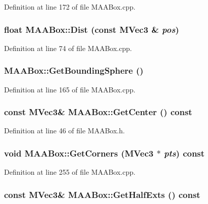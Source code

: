 Definition at line 172 of file MAABox.cpp.\hypertarget{class_m_a_a_box_f47c228010eab1bd502d80633d50953b}{
\subsubsection[{Dist}]{\setlength{\rightskip}{0pt plus 5cm}float MAABox::Dist (const {\bf MVec3} \& {\em pos})}}
\label{class_m_a_a_box_f47c228010eab1bd502d80633d50953b}




Definition at line 74 of file MAABox.cpp.\hypertarget{class_m_a_a_box_069339e97ffae23154079bca22eafaf7}{
\subsubsection[{GetBoundingSphere}]{ MAABox::GetBoundingSphere ()}}
\label{class_m_a_a_box_069339e97ffae23154079bca22eafaf7}




Definition at line 165 of file MAABox.cpp.\hypertarget{class_m_a_a_box_a9fbd78524a8e1c00a165177b7cf888f}{
\subsubsection[{GetCenter}]{\setlength{\rightskip}{0pt plus 5cm}const {\bf MVec3}\& MAABox::GetCenter () const}}
\label{class_m_a_a_box_a9fbd78524a8e1c00a165177b7cf888f}




Definition at line 46 of file MAABox.h.\hypertarget{class_m_a_a_box_1880d28cd10db452fd1ef1d9d74774c9}{
\subsubsection[{GetCorners}]{\setlength{\rightskip}{0pt plus 5cm}void MAABox::GetCorners ({\bf MVec3} $\ast$ {\em pts}) const}}
\label{class_m_a_a_box_1880d28cd10db452fd1ef1d9d74774c9}




Definition at line 255 of file MAABox.cpp.\hypertarget{class_m_a_a_box_9c4c37dd6c9bffdbe6926c5a4c60145c}{
\subsubsection[{GetHalfExts}]{\setlength{\rightskip}{0pt plus 5cm}const {\bf MVec3}\& MAABox::GetHalfExts () const}}
\label{class_m_a_a_box_9c4c37dd6c9bffdbe6926c5a4c60145c}




